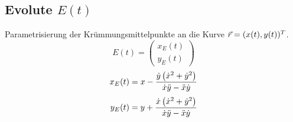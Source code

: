 \subsection{Evolute \hfill $E(t)$}
    Parametrisierung der Krümmungsmittelpunkte an die Kurve $\vec{r} = (x(t), y(t))^T$.
    $$
        E(t) = 
        \begin{pmatrix}
            x_E(t)\\y_E(t)
        \end{pmatrix}
    $$
    \begin{align*}
        x_E(t) &= x - \frac{\dot{y} \left( \dot{x}^2 + \dot{y}^2 \right)}{\dot{x} \ddot{y} - \ddot{x} \dot{y}}\\[0.25em]
        y_E(t) &= y + \frac{\dot{x} \left( \dot{x}^2 + \dot{y}^2 \right)}{\dot{x} \ddot{y} - \ddot{x} \dot{y}}
    \end{align*}

